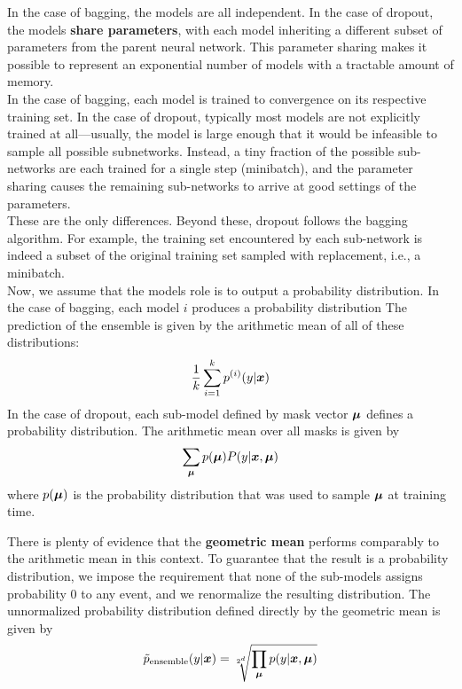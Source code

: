 \begin{multicols}{2}
	In the case of bagging, the models are all independent. In the case of dropout, the models \textbf{share parameters}, with each model inheriting a different subset of parameters from the parent neural network.
	This parameter sharing makes it possible to represent an exponential number of models with a tractable amount of memory.\\
	
	In the case of bagging, each model is trained to convergence on its respective training set.
	In the case of dropout, typically most models are not explicitly trained at all—usually, the model is large enough that it would be infeasible to sample all possible subnetworks. Instead, a tiny fraction of the possible sub-networks are each trained for a single step (minibatch), and the parameter sharing causes the remaining sub-networks to arrive at good settings of the parameters.\\
	
	These are the only differences. Beyond these, dropout follows the bagging algorithm. For example, the training set encountered by each sub-network is indeed a subset of the original training set sampled with replacement, i.e., a minibatch.\\
	
	Now, we assume that the models role is to output a probability distribution.
	In the case of bagging, each model $i$ produces a probability distribution
	The prediction of the ensemble is given by the arithmetic mean of all of these distributions:
	\[ \frac{1}{k}\sum_{i=1}^{k}p^{(i)}(y|{\bm{x}}) \]
	In the case of dropout, each sub-model defined by mask vector ${\bm{\mu}}$ defines a probability distribution.
	The arithmetic mean over all masks is given by
	\[ \sum_{\bm{\mu}} p({\bm{\mu}})P(y|{\bm{x}},{\bm{\mu}}) \]
	where $p({\bm{\mu}})$ is the probability distribution that was used to sample ${\bm{\mu}}$ at training time.
	
	There is plenty of evidence that the \textbf{geometric mean} performs comparably to the arithmetic mean in this context.
	To guarantee that the result is a probability distribution, we impose the requirement that none of the sub-models assigns probability 0 to any event, and we renormalize the resulting distribution.
	The unnormalized probability distribution defined directly by the geometric mean is given by
	\[ \tilde{p}_{\text{ensemble}}(y|{\bm{x}}) = \sqrt[2^d]{\prod_{\bm{\mu}} p(y|{\bm{x}},{\bm{\mu}})} \]
	

\end{multicols}
